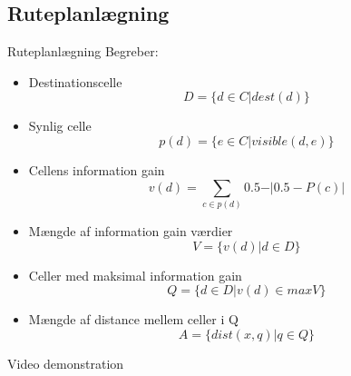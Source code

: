 \subsection{Ruteplanlægning}

\begin{frame}{Ruteplanlægning}
Begreber:
\begin{itemize}
\item Destinationscelle
$$D = \{d \in C \vert dest(d) \}$$
\item Synlig celle
$$p(d) = \{e \in C \vert visible(d,e) \}$$
\item Cellens information gain
$$v(d) = \sum_{c \in p(d)}{0.5- \vert 0.5 - P(c) \vert}$$
\end{itemize}

\end{frame}


\begin{frame}

\begin{itemize}
\item Mængde af information gain værdier
$$V = \{v(d) \vert d \in D \}$$
\item Celler med maksimal information gain
$$Q = \{ d \in D \vert v(d) \in maxV \}$$
\item Mængde af distance mellem celler i Q
$$A = \{dist(x,q) \vert q \in Q \}$$
\end{itemize}

\end{frame}

\begin{frame}

\centering
Video demonstration

\end{frame}
